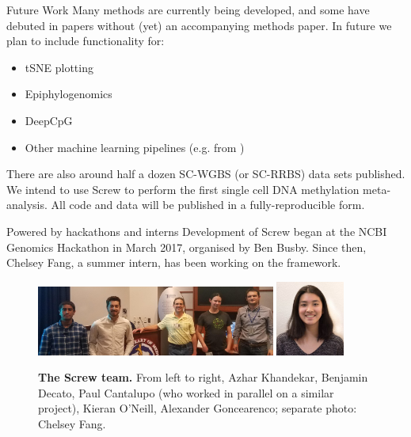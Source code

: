 \documentclass{beamer}
\begin{document}
\begin{frame}
\begin{columns}[t]
\begin{column}{.65\textwidth}
\begin{columns}[t,totalwidth=\textwidth]
\begin{column}{.48\textwidth}
\begin{block}{Future Work}
Many methods are currently being developed, and some have debuted in papers without (yet) an accompanying methods paper. In future we plan to include functionality for:
\begin{itemize}
\item tSNE plotting
\item Epiphylogenomics
\item DeepCpG
\item Other machine learning pipelines (e.g. from \cite{Farlik2016}) 
\end{itemize}

There are also around half a dozen SC-WGBS (or SC-RRBS) data sets published. We intend to use Screw to perform the first single cell DNA methylation meta-analysis. All code and data will be published in a fully-reproducible form. 

\end{block}


\begin{block}{Powered by hackathons and interns}
Development of Screw began at the NCBI Genomics Hackathon in March 2017, organised by Ben Busby. Since then, Chelsey Fang, a summer intern, has been working on the framework.


\begin{figure}
\begin{center}
  \includegraphics[width=0.7\textwidth]{figures/hackathon_team.jpg}
  \includegraphics[width=0.2\textwidth]{figures/chelsey.jpg}
\end{center}
\caption{\textbf{The Screw team.} From left to right, Azhar Khandekar, Benjamin Decato, Paul Cantalupo (who worked in parallel on a similar project), Kieran O'Neill, Alexander Goncearenco; separate photo: Chelsey Fang.}
\end{figure}

\end{block}


\end{column}
\end{columns}
\end{column}
\end{columns}
\end{frame}
\end{document}
